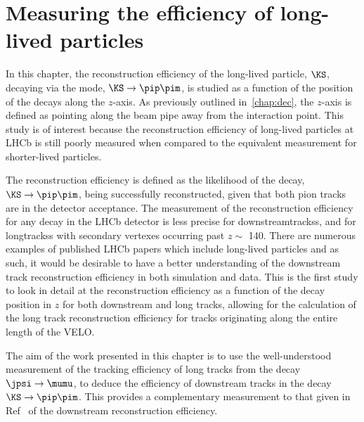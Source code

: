 \chapter{Measuring the efficiency of long-lived particles}
\label{chap:ks}
In this chapter, the reconstruction efficiency of the long-lived particle, $\KS$, decaying via the mode, $\KS\to\pip\pim$, is studied as a function of the position of the \KS decays along the $z$-axis. As previously outlined in~\autoref{chap:dec}, the $z$-axis is defined as pointing along the beam pipe away from the interaction point. This study is of interest because the reconstruction efficiency of long-lived particles at LHCb is still poorly measured when compared to the equivalent measurement for shorter-lived particles.


The reconstruction efficiency is defined as the likelihood of the decay, $\KS\to\pip\pim$, being successfully reconstructed, given that both pion tracks are in the detector acceptance. The measurement of the reconstruction efficiency for any decay in the LHCb detector is less precise for \glspl{downstreamtracks}, and for \glspl{longtracks} with secondary vertexes occurring past $z \sim$ 140\mm. There are numerous examples of published LHCb papers which include long-lived particles \cite{LHCb-PAPER-2010-001,LHCb-PAPER-2011-005,LHCb-PAPER-2011-041,LHCb-PAPER-2012-011,LHCb-PAPER-2012-016,LHCb-PAPER-2012-023,LHCb-PAPER-2012-027,LHCb-PAPER-2012-035,LHCb-PAPER-2012-052,LHCb-PAPER-2012-057,LHCb-PAPER-2013-015,LHCb-PAPER-2013-025,LHCb-PAPER-2013-034,LHCb-PAPER-2013-042} and as such, it would be desirable to have a better understanding of the downstream track reconstruction efficiency in both simulation and data. This is the first study to look in detail at the reconstruction efficiency as a function of the decay position in $z$ for both downstream and long tracks, allowing for the calculation of the long track reconstruction efficiency for tracks originating along the entire length of the \gls{VELO}.

The aim of the work presented in this chapter is to use the well-understood measurement of the tracking efficiency of long tracks from the decay $\jpsi\to\mumu$, to deduce the efficiency of downstream tracks in the decay $\KS\to\pip\pim$. This provides a complementary measurement to that given in Ref~\cite{DDpat} of the downstream reconstruction efficiency. %



